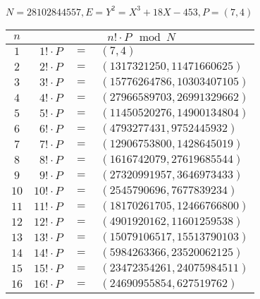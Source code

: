 \documentclass[12pt]{article}
\begin{document}
\newpage
\subproblem $N=28102844557,E=Y^2=X^3+18X-453,P=(7,4)$

\solution
\begin{table}[!ht]
    \centering
    \begin{tabular}{|c|rcl|}
        \hline
        $n$  & \multicolumn{3}{c|}{$n!\cdot P\mod{N}$}                                      \\ \hline
        $1$  & $1!\cdot P$                             & $=$ & $(7, 4)$                     \\ \hline
        $2$  & $2!\cdot P$                             & $=$ & $(1317321250, 11471660625)$  \\ \hline
        $3$  & $3!\cdot P$                             & $=$ & $(15776264786, 10303407105)$ \\ \hline
        $4$  & $4!\cdot P$                             & $=$ & $(27966589703, 26991329662)$ \\ \hline
        $5$  & $5!\cdot P$                             & $=$ & $(11450520276, 14900134804)$ \\ \hline
        $6$  & $6!\cdot P$                             & $=$ & $(4793277431, 9752445932)$   \\ \hline
        $7$  & $7!\cdot P$                             & $=$ & $(12906753800, 1428645019)$  \\ \hline
        $8$  & $8!\cdot P$                             & $=$ & $(1616742079, 27619685544)$  \\ \hline
        $9$  & $9!\cdot P$                             & $=$ & $(27320991957, 3646973433)$  \\ \hline
        $10$ & $10!\cdot P$                            & $=$ & $(2545790696, 7677839234)$   \\ \hline
        $11$ & $11!\cdot P$                            & $=$ & $(18170261705, 12466766800)$ \\ \hline
        $12$ & $12!\cdot P$                            & $=$ & $(4901920162, 11601259538)$  \\ \hline
        $13$ & $13!\cdot P$                            & $=$ & $(15079106517, 15513790103)$ \\ \hline
        $14$ & $14!\cdot P$                            & $=$ & $(5984263366, 23520062125)$  \\ \hline
        $15$ & $15!\cdot P$                            & $=$ & $(23472354261, 24075984511)$ \\ \hline
        $16$ & $16!\cdot P$                            & $=$ & $(24690955854, 627519762)$   \\ \hline

\end{tabular}
\end{table}
\end{document}
